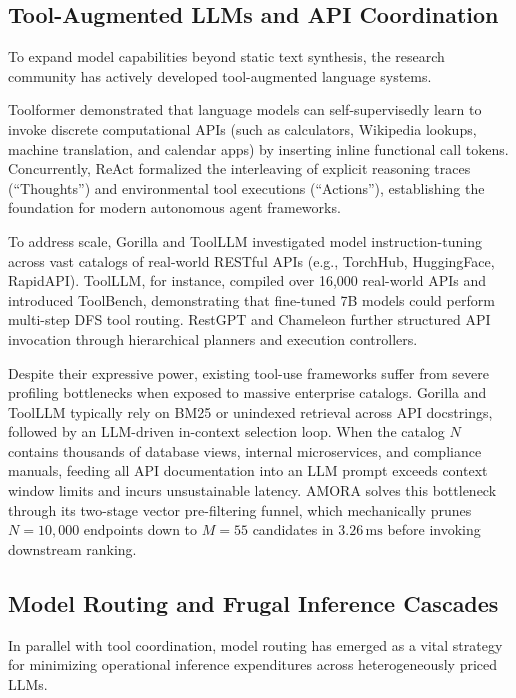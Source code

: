 \subsection{Tool-Augmented LLMs and API Coordination}
To expand model capabilities beyond static text synthesis, the research community has actively developed tool-augmented language systems.

Toolformer \cite{schick2023toolformer} demonstrated that language models can self-supervisedly learn to invoke discrete computational APIs (such as calculators, Wikipedia lookups, machine translation, and calendar apps) by inserting inline functional call tokens. Concurrently, ReAct \cite{yao2022react} formalized the interleaving of explicit reasoning traces (``Thoughts'') and environmental tool executions (``Actions''), establishing the foundation for modern autonomous agent frameworks.

To address scale, Gorilla \cite{patil2023gorilla} and ToolLLM \cite{qin2023toolllm} investigated model instruction-tuning across vast catalogs of real-world RESTful APIs (e.g., TorchHub, HuggingFace, RapidAPI). ToolLLM, for instance, compiled over 16,000 real-world APIs and introduced ToolBench, demonstrating that fine-tuned 7B models could perform multi-step DFS tool routing. RestGPT \cite{song2023restgpt} and Chameleon \cite{lu2023chameleon} further structured API invocation through hierarchical planners and execution controllers.

Despite their expressive power, existing tool-use frameworks suffer from severe profiling bottlenecks when exposed to massive enterprise catalogs. Gorilla and ToolLLM typically rely on BM25 or unindexed retrieval across API docstrings, followed by an LLM-driven in-context selection loop. When the catalog $N$ contains thousands of database views, internal microservices, and compliance manuals, feeding all API documentation into an LLM prompt exceeds context window limits and incurs unsustainable latency. AMORA solves this bottleneck through its two-stage vector pre-filtering funnel, which mechanically prunes $N=10,000$ endpoints down to $M=55$ candidates in $3.26\,\text{ms}$ before invoking downstream ranking.

\subsection{Model Routing and Frugal Inference Cascades}
In parallel with tool coordination, model routing has emerged as a vital strategy for minimizing operational inference expenditures across heterogeneously priced LLMs.

